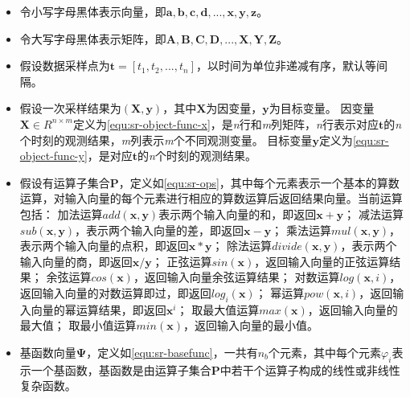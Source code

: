 \begin{itemize}

  \item 令小写字母黑体表示向量，即$\mathbf{a,b,c,d,...,x,y,z}$。

  \item 令大写字母黑体表示矩阵，即$\mathbf{A,B,C,D,...,X,Y,Z}$。

  \item 假设数据采样点为$\mathbf{t}=[t_{1},t_{2},...,t_{n}]$，以时间为单位非递减有序，默认等间隔。

  \item 假设一次采样结果为$(\mathbf{X},\mathbf{y})$，其中$\mathbf{X}$为{\heiti 因变量}，$\mathbf{y}$为{\heiti 目标变量}。
  因变量$ \mathbf{X} \in R^{n\times m} $定义为\ref{equ:sr-object-func-x}，是\emph{n}行和\emph{m}列矩阵，\emph{n}行表示对应$\mathbf{t}$的\emph{n}个时刻的观测结果，\emph{m}列表示\emph{m}个不同观测变量。
  目标变量$\mathbf{y}$定义为\ref{equ:sr-object-func-y}，是对应$\mathbf{t}$的\emph{n}个时刻的观测结果。

  \item 假设有{\heiti 运算子}集合$\mathbf{P}$，定义如\ref{equ:sr-ops}，其中每个元素表示一个基本的算数运算，对输入向量的每个元素进行相应的算数运算后返回结果向量。当前运算包括：
  加法运算$add(\mathbf{x,y})$表示两个输入向量的和，即返回$\mathbf{x}+\mathbf{y}$；
  减法运算$sub(\mathbf{x,y})$，表示两个输入向量的差，即返回$\mathbf{x}-\mathbf{y}$；
  乘法运算$mul(\mathbf{x,y})$，表示两个输入向量的点积，即返回$\mathbf{x} * \mathbf{y}$；
  除法运算$divide(\mathbf{x,y})$，表示两个输入向量的商，即返回$\mathbf{x}/\mathbf{y}$；
  正弦运算$sin(\mathbf{x})$，返回输入向量的正弦运算结果；
  余弦运算$cos(\mathbf{x})$，返回输入向量余弦运算结果；
  对数运算$log(\mathbf{x}, i) $，返回输入向量的对数运算即过，即返回$log_{i}(\mathbf{x})$；
  幂运算$pow(\mathbf{x}, i)$，返回输入向量的幂运算结果，即返回$\mathbf{x}^{i}$；
  取最大值运算$max(\mathbf{x})$，返回输入向量的最大值；
  取最小值运算$min(\mathbf{x})$，返回输入向量的最小值。
  \item 基函数向量$\mathbf{\Psi}$，定义如\ref{equ:sr-basefunc}，一共有$n_{b}$个元素，其中每个元素$\varphi_{i}$表示一个{\heiti 基函数}，基函数是由运算子集合$\mathbf{P}$中若干个运算子构成的线性或非线性复杂函数。

\end{itemize}
